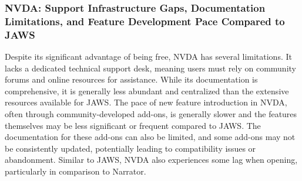 \subsubsection{NVDA: Support Infrastructure Gaps, Documentation Limitations, and Feature Development Pace Compared to JAWS}
Despite its significant advantage of being free, NVDA has several limitations. It lacks a dedicated technical support desk, meaning users must rely on community forums and online resources for assistance.\supercite{kingsbury2025} While its documentation is comprehensive, it is generally less abundant and centralized than the extensive resources available for JAWS.\supercite{kingsbury2025} The pace of new feature introduction in NVDA, often through community-developed add-ons, is generally slower and the features themselves may be less significant or frequent compared to JAWS. The documentation for these add-ons can also be limited, and some add-ons may not be consistently updated, potentially leading to compatibility issues or abandonment.\supercite{kingsbury2025} Similar to JAWS, NVDA also experiences some lag when opening, particularly in comparison to Narrator.\supercite{kingsbury2025}

